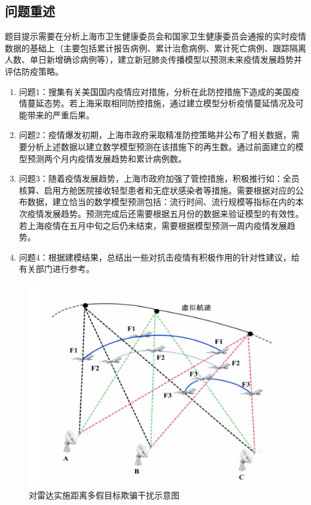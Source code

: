 \documentclass[bwprint]{gmcmthesis}
\numberwithin{figure}{section}
\begin{document}
\subsection{问题重述}
题目提示需要在分析上海市卫生健康委员会和国家卫生健康委员会通报的实时疫情数据的基础上（主要包括累计报告病例、累计治愈病例、累计死亡病例、跟踪隔离人数、单日新增确诊病例等），建立新冠肺炎传播模型以预测未来疫情发展趋势并评估防疫策略。
\begin{enumerate}
\item
问题1：搜集有关美国国内疫情应对措施，分析在此防控措施下造成的美国疫情蔓延态势。若上海采取相同防控措施，通过建立模型分析疫情蔓延情况及可能带来的严重后果。
\item 问题2：疫情爆发初期，上海市政府采取精准防控策略并公布了相关数据，需要分析上述数据以建立数学模型预测在该措施下的再生数。通过前面建立的模型预测两个月内疫情发展趋势和累计病例数。
\item 问题3：随着疫情发展趋势，上海市政府加强了管控措施，积极推行如：全员核算、启用方舱医院接收轻型患者和无症状感染者等措施。需要根据对应的公布数据，建立恰当的数学模型预测包括：流行时间、流行规模等指标在内的本次疫情发展趋势。预测完成后还需要根据五月份的数据来验证模型的有效性。若上海疫情在五月中旬之后仍未结束，需要根据模型预测一周内疫情发展趋势。
\item 问题4：根据建模结果，总结出一些对抗击疫情有积极作用的针对性建议，给有关部门进行参考。
\end{enumerate}

\begin{figure}[!h]
\centering
\includegraphics[width=.7\textwidth]{test.jpg}
\caption{对雷达实施距离多假目标欺骗干扰示意图}
\label{fig1}
\end{figure}
\end{document}
